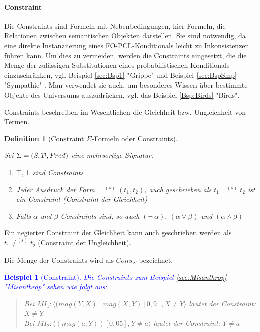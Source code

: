 \documentclass[a4paper, 11pt]{book}
\newtheorem{Def}{Definition }[section]
\newtheorem{Bsp}{Beispiel}[section]
\begin{document}
\paragraph{Constraint}  \label{constraint}

Die Constraints  sind Formeln mit Nebenbedingungen, hier Formeln, die Relationen zwischen semantischen Objekten darstellen. Sie sind notwendig, da eine direkte Instanziierung eines FO-PCL-Konditionals  leicht zu Inkonsistenzen führen kann. Um dies zu vermeiden, werden die Constraints eingesetzt, die die Menge der zulässigen Substitutionen eines probabilistischen Konditionals  einzuschränken, vgl. Beispiel \ref{sec:Bsp1} "{}Grippe"{}  und Beispiel \ref{sec:BspSmp} "{}Sympathie"{} . Man verwendet sie auch, um besonderes Wissen über bestimmte Objekte des Universums auszudrücken, vgl. das Beispiel \ref{Bsp:Birds} "{}Birds"{}.

\noindent
Constraints beschreiben im Wesentlichen die Gleichheit bzw. Ungleichheit von Termen.

\begin{Def}[Constraint $ \Sigma $-Formeln oder Constraints]\cite[Kap. 6.2, S. 126/127 vgl. Def. 6.2.4]{Fis10} \label{Def:Constraint}
		
\noindent
Sei $ \Sigma = (S, {\cal D}, Pred) $ eine mehrsortige Signatur.
\begin{enumerate}
\renewcommand{\labelenumi}{\textnormal{(\theenumi)}}
\item {$ \top, \bot $ sind  Constraints}
\item {Jeder Ausdruck der Form $ =^{(s)} (t_1, t_2)$, auch geschrieben als $ t_1 =^{(s)} t_2 $} ist ein Constraint (Constraint der Gleichheit)
\item{Falls $ \alpha $ und $ \beta $ Constraints sind, so auch $  (\neg ~ \alpha),~  (\alpha \vee \beta)$ und $ (\alpha \wedge \beta)  $} 
\end{enumerate}
\end{Def}
Ein negierter Constraint der Gleichheit kann auch geschrieben werden als $ t_1 \not=^{(s)} t_2 $ (Constraint der Ungleichheit). 

\noindent
Die Menge der Constraints wird als $ Cons_{\Sigma} $  bezeichnet.

\textcolor{blue}{
\begin{Bsp}[Constraint] \label{Bsp:Constraint}
	Die Constraints zum Beispiel \ref{sec:Misanthrop} "{}Misanthrop"{} sehen wie folgt aus:\\
	\begin{quote}
	Bei	$ MI_1 : \langle (mag(Y, X) \mid mag(X, Y)[0,9], X \neq Y \rangle$ lautet der Constraint: $  X \neq Y  $\\
	Bei	$ MI_2 : \langle (mag(a, Y))[0,05], Y \neq a \rangle$ lautet der Constraint: $  Y \neq a  $\\
	\end{quote}
\end{Bsp}
}
\end{document}
